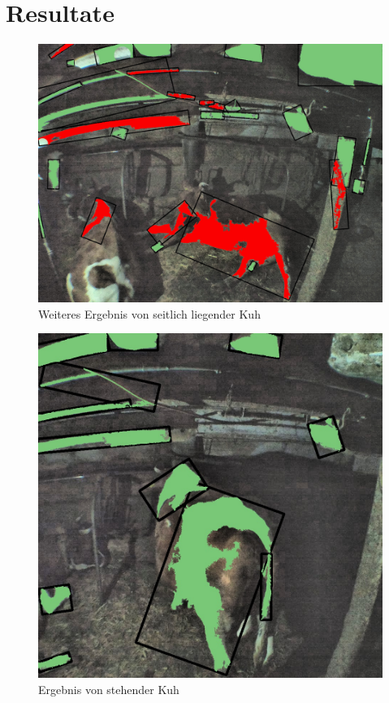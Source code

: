 

\chapter{Resultate}

\begin{figure}[H]
	\center
	\includegraphics[scale=0.1]{Grafiken/resultatLying2.jpg}
	\caption{Weiteres Ergebnis von seitlich liegender Kuh} 
	\label{fig: Weiteres Ergebnis von seitlich liegender Kuh} 
\end{figure}

\begin{figure}[H]
	\center
	\includegraphics[scale=0.1]{Grafiken/resultatStanding1.jpg}
	\caption{Ergebnis von stehender Kuh} 
	\label{fig: Ergebnis von stehender Kuh} 
\end{figure}

